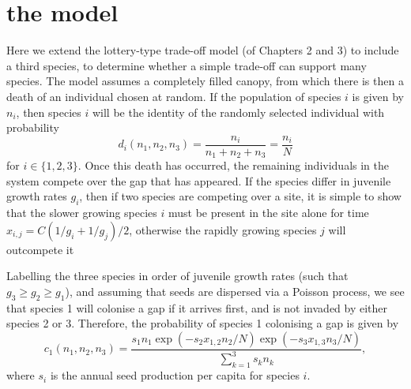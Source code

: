 \section{the model}
Here we extend the lottery-type trade-off model (of Chapters 2 and 3) to include a third species, to determine whether a simple trade-off can support many species. The model assumes a completely filled canopy, from which there is then a death of an individual chosen at random. If the population of species $i$ is given by $n_i$, then species $i$ will be the identity of the randomly selected individual with probability
\begin{equation}
\label{d}
d_i(n_1,n_2,n_3)=\frac{n_i}{n_1+n_2+n_3}=\frac{n_i}{N} \end{equation}
for $i \in \{1,2,3\}$. Once this death has occurred, the remaining individuals in the system compete over the gap that has appeared. If the species differ in juvenile growth rates $g_i$, then if two species are competing over a site, it is simple to show that the slower growing species $i$ must be present in the site alone for time $x_{i,j}=C(1/g_i +1/g_j)/2$, otherwise the rapidly growing species $j$ will outcompete it

Labelling the three species in order of juvenile growth rates (such that $g_3 \geq g_2\geq g_1$), and assuming that seeds are dispersed via a Poisson process, we see that species 1 will colonise a gap if it arrives first, and is not invaded by either species 2 or 3. Therefore, the probability of species 1 colonising a gap is given by
\begin{equation}
\label{c1}
c_1(n_1,n_2,n_3)=\frac{s_1 n_1 \exp(-s_2x_{1,2}n_2/N)\exp(-s_3x_{1,3}n_3/N)}{\sum_{k=1}^3 s_k n_k},\end{equation}
where $s_i$ is the annual seed production per capita for species $i$.

